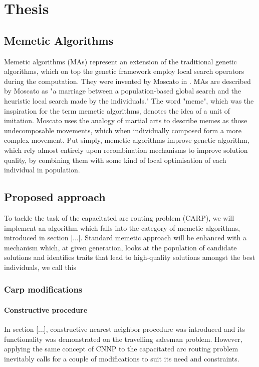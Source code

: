 \documentclass[oneside]{ctuthesis}
\theoremstyle{plain}
\theoremstyle{definition}
\theoremstyle{note}
\begin{document}
\chapter{Thesis}
\section{Memetic Algorithms}
Memetic algorithms (MAs) represent an extension of the traditional genetic algorithms, which on top the genetic framework employ local search operators during the computation. They were invented by Moscato in \cite{moscato1989evolution}. MAs are described by Moscato as "a marriage between a population-based global search and the heuristic local search made by the individuals." The word "meme", which was the inspiration for the term memetic algorithms, denotes the idea of a unit of imitation. Moscato uses the analogy of martial arts to describe memes as those undecomposable movements, which when individually composed form a more complex movement. Put simply, memetic algorithms improve genetic algorithm, which rely almost entirely upon recombination mechanisms to improve solution quality, by combining them with some kind of local optimisation of each individual in population. 

\section{Proposed approach}
To tackle the task of the capacitated arc routing problem (CARP), we will implement an algorithm which falls into the category of memetic algorithms, introduced in section [...]. Standard memetic approach will be enhanced with a mechanism which, at given generation, looks at the population of candidate solutions and identifies traits that lead to high-quality solutions amongst the best individuals, we call this 

\subsection{Carp modifications}

\subsubsection{Constructive procedure}
In section [...], constructive nearest neighbor procedure was introduced and its functionality was demonstrated on the travelling salesman problem. However, applying the same concept of CNNP to the capacitated arc routing problem inevitably calls for a couple of modifications to suit its need and constraints.
	
\end{document}
